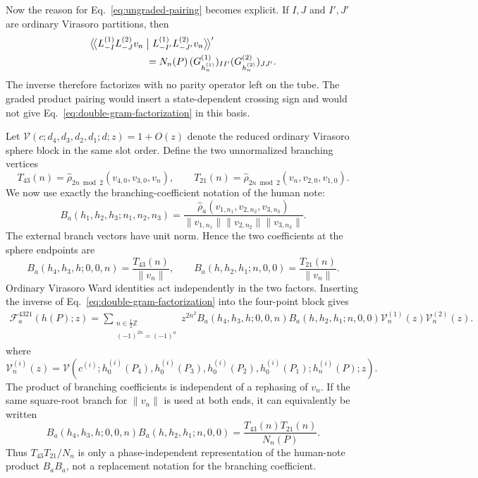 \documentclass[11pt]{article}
\newcommand{\cF}{\mathcal F}
\newcommand{\cV}{\mathcal V}
\newcommand{\hatrho}{\widehat\rho}
\newcommand{\bpz}[2]{\bigl\langle\!\bigl\langle #1\bigm|#2\bigr\rangle\!\bigr\rangle}
\begin{document}
Now the reason for Eq.~\eqref{eq:ungraded-pairing} becomes explicit.  If
\(I,J\) and \(I',J'\) are ordinary Virasoro partitions, then
\begin{align}
 &\bpz{L_{-I}^{(1)}L_{-J}^{(2)}v_n}
 {L_{-I'}^{(1)}L_{-J'}^{(2)}v_n}'
 \nonumber\\
 &\hspace{2cm}=
 N_n(P)\,(G_{h_n^{(1)}}^{(1)})_{II'}
 (G_{h_n^{(2)}}^{(2)})_{JJ'}.
 \label{eq:double-gram-factorization}
\end{align}
The inverse therefore factorizes with no parity operator left on the tube.
The graded product pairing would insert a state-dependent crossing sign and
would not give Eq.~\eqref{eq:double-gram-factorization} in this basis.

Let \(\cV(c;d_4,d_3,d_2,d_1;d;z)=1+O(z)\) denote the reduced ordinary
Virasoro sphere block in the same slot order.  Define the two unnormalized
branching vertices
\begin{equation}
 T_{43}(n)=\hatrho_{2n\bmod2}(v_{4,0},v_{3,0},v_n),
 \qquad
 T_{21}(n)=\hatrho_{2n\bmod2}(v_n,v_{2,0},v_{1,0}).
 \label{eq:endpoint-vertices}
\end{equation}
We now use exactly the branching-coefficient notation of the human note:
\begin{equation}
 \boxed{
 B_a(h_1,h_2,h_3;n_1,n_2,n_3)
 =\frac{
 \hatrho_a(v_{1,n_1},v_{2,n_2},v_{3,n_3})
 }{
 \lVert v_{1,n_1}\rVert
 \lVert v_{2,n_2}\rVert
 \lVert v_{3,n_3}\rVert
 }.}
 \label{eq:human-B-definition}
\end{equation}
The external branch vectors have unit norm.  Hence the two coefficients at
the sphere endpoints are
\begin{equation}
 B_a(h_4,h_3,h;0,0,n)=\frac{T_{43}(n)}{\lVert v_n\rVert},
 \qquad
 B_a(h,h_2,h_1;n,0,0)=\frac{T_{21}(n)}{\lVert v_n\rVert}.
 \label{eq:sphere-B-endpoints}
\end{equation}
Ordinary Virasoro Ward identities act independently in the two factors.
Inserting the inverse of Eq.~\eqref{eq:double-gram-factorization} into the
four-point block gives
\begin{align}
 \boxed{
 \cF_a^{4321}(h(P);z)
 =\sum_{\substack{n\in\frac12\mathbb Z\\(-1)^{2n}=(-1)^a}}
 z^{2n^2}
 B_a(h_4,h_3,h;0,0,n)
 B_a(h,h_2,h_1;n,0,0)
 \cV_n^{(1)}(z)\cV_n^{(2)}(z).}
 \label{eq:final-B-formula}
\end{align}
where
\begin{equation}
 \cV_n^{(i)}(z)=
 \cV\!\left(
 c^{(i)};
 h_{0}^{(i)}(P_4),h_{0}^{(i)}(P_3),
 h_{0}^{(i)}(P_2),h_{0}^{(i)}(P_1);
 h_n^{(i)}(P);z\right).
 \label{eq:factor-blocks}
\end{equation}
The product of branching coefficients is independent of a rephasing of
\(v_n\).  If the same square-root branch for \(\lVert v_n\rVert\) is used at
both ends, it can equivalently be written
\begin{equation}
 B_a(h_4,h_3,h;0,0,n)
 B_a(h,h_2,h_1;n,0,0)
 =\frac{T_{43}(n)T_{21}(n)}{N_n(P)}.
 \label{eq:B-product-phase-independent}
\end{equation}
Thus \(T_{43}T_{21}/N_n\) is only a phase-independent representation of the
human-note product \(B_aB_a\), not a replacement notation for the branching
coefficient.
\end{document}
